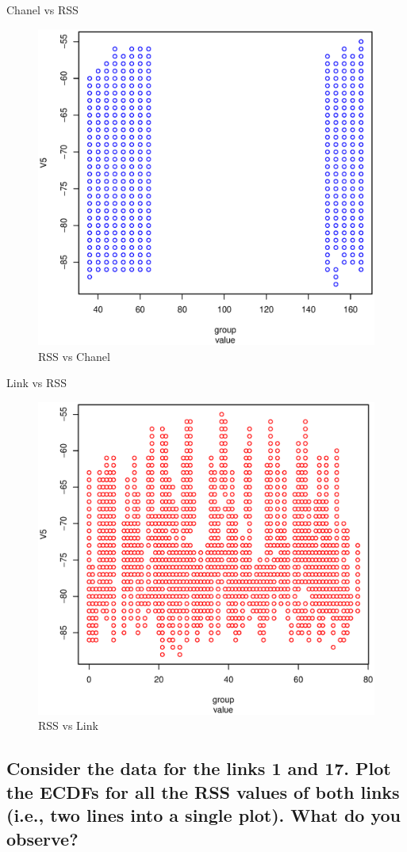 \documentclass [12 pt , a4paper ] {article}
\begin{document}
\par Chanel vs RSS
\begin{figure}[!ht]
  \centering
  \includegraphics[scale=0.8]{light-rssvsch.eps}
  \caption{RSS vs Chanel}
  \label{fig:rssvsch}
\end{figure}

\par Link vs RSS
\begin{figure}[!ht]
  \centering
  \includegraphics[scale=0.8]{lighter-rssvslink.eps}
  \caption{RSS vs Link}
  \label{fig:rssvslink}
\end{figure}
\subsection{Consider the data for the links 1 and 17. Plot 
the ECDFs for all the RSS values of both links
(i.e., two lines into a single plot). What do you observe?}

\printbibliography
\end{document}

